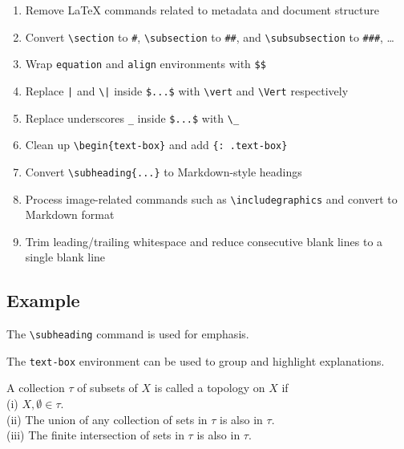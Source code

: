 \documentclass[11pt]{article}
\renewcommand{\(}{\left(}
\renewcommand{\)}{\right)}
\renewcommand{\[}{\left[}
\renewcommand{\]}{\right]}
\newenvironment{text-box}{}{}
\newcommand{\subheading}[1]{\noindent[ #1 ]}
\begin{document}
\begin{enumerate}
    \item Remove LaTeX commands related to metadata and document structure
    \item Convert \verb|\section| to \verb|#|, \verb|\subsection| to \verb|##|, and \verb|\subsubsection| to \verb|###|, \dots
    \item Wrap \verb|equation| and \verb|align| environments with \verb|$$|
    \item Replace \verb!|! and \verb!\|! inside \verb|$...$| with \verb|\vert| and \verb|\Vert| respectively
    \item Replace underscores \verb|_| inside \verb|$...$| with \verb|\_|
    \item Clean up \verb|\begin{text-box}| and add \verb|{: .text-box}|
    \item Convert \verb|\subheading{...}| to Markdown-style headings
    \item Process image-related commands such as \verb|\includegraphics| and convert to Markdown format
    \item Trim leading/trailing whitespace and reduce consecutive blank lines to a single blank line
\end{enumerate}

\subsection{Example}

The \verb|\subheading| command is used for emphasis.

\subheading{proof}

The \verb|text-box| environment can be used to group and highlight explanations.

\begin{text-box}
    A collection $\tau$ of subsets of $X$ is called a topology on $X$ if \\
    (i) $X, \emptyset \in \tau$. \\
    (ii) The union of any collection of sets in $\tau$ is also in $\tau$. \\
    (iii) The finite intersection of sets in $\tau$ is also in $\tau$.
\end{text-box}
\end{document}
